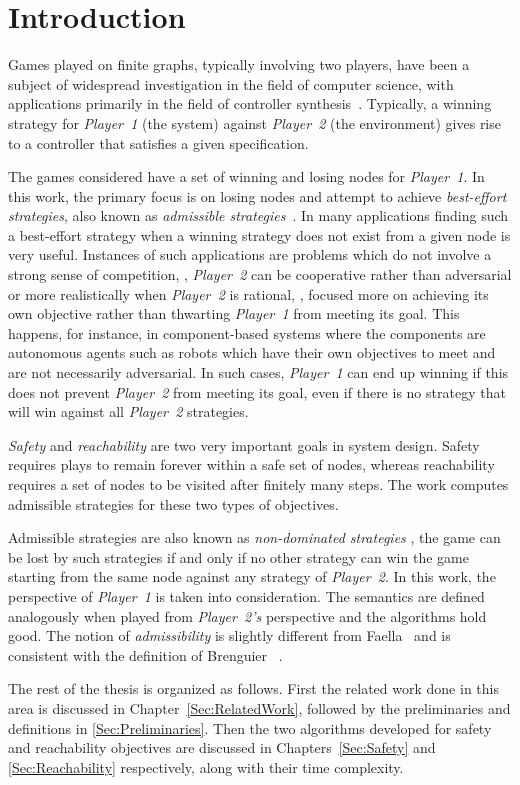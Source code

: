 \chapter{Introduction}
\label{Sec:Introduction}
Games played on finite graphs, typically involving two players, have
been a subject of widespread investigation in the field of computer
science, with applications primarily in the field of controller
synthesis~\cite{SynthesisOfReactiveModule}. Typically, a winning
strategy for \textit{Player~1} (the system) against \textit{Player~2}
(the environment) gives rise to a controller that satisfies a given
specification.

The games considered have a set of winning and losing nodes for
\textit{Player~1}. In this work, the primary focus is on losing nodes
and attempt to achieve \textit{best-effort strategies}, also known as
\textit{admissible strategies}~\cite{OmegaRegularGames}. In many
applications finding such a best-effort strategy when a winning
strategy does not exist from a given node is very useful. Instances of
such applications are problems which do not involve a strong sense of
competition, \ie, \textit{Player~2} can be cooperative rather than
adversarial or more realistically when \textit{Player~2} is rational,
\ie, focused more on achieving its own objective rather than thwarting
\textit{Player~1} from meeting its goal. This happens, for instance,
in component-based systems where the components are autonomous agents
such as robots which have their own objectives to meet and are not
necessarily adversarial. In such cases, \textit{Player~1} can end up
winning if this does not prevent \textit{Player~2} from meeting its
goal, even if there is no strategy that will win against all
\textit{Player~2} strategies.

\textit{Safety} and \textit{reachability} are two very important goals
in system design. Safety requires plays to remain forever within a
safe set of nodes, whereas reachability requires a set of nodes to be
visited after finitely many steps. The work computes admissible
strategies for these two types of objectives.

Admissible strategies are also known as \textit{non-dominated
	strategies} \ie, the game can be lost by such strategies if and only
if no other strategy can win the game starting from the same node
against any strategy of \textit{Player~2}. In this work, the
perspective of \textit{Player~1} is taken into consideration. The semantics are defined
analogously when played from \textit{Player~2's} perspective and the
algorithms hold good. The notion of \textit{admissibility} is slightly
different from Faella~\cite{AdmissibleInfiniteGames} and is consistent
with the definition of Brenguier \etal~\cite{OmegaRegularGames}.

The rest of the thesis is organized as follows. First the
related work done in this area is discussed in Chapter~\ref{Sec:RelatedWork},
followed by the preliminaries and definitions
in \ref{Sec:Preliminaries}. Then the two algorithms
developed for safety and reachability objectives are discussed in
Chapters~\ref{Sec:Safety} and \ref{Sec:Reachability} respectively,
along with their time complexity.
